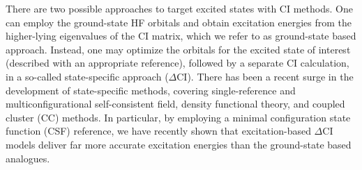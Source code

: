\documentclass[aip,jcp,reprint,noshowkeys,superscriptaddress]{revtex4-1}
\begin{document}
There are two possible approaches to target excited states with CI methods.
One can employ the ground-state HF orbitals and obtain excitation energies from the higher-lying eigenvalues of the CI matrix, which we refer to as ground-state based approach.
Instead, one may optimize the orbitals for the excited state of interest (described with an appropriate reference), followed by a separate CI calculation,
in a so-called state-specific approach ($\Delta$CI).
There has been a recent surge in the development of state-specific methods, covering 
single-reference and multiconfigurational self-consistent field,
\cite{Ziegler_1977,Burton_2021,Shea_2018,Tran_2019,Tran_2020,Hardikar_2020,Burton_2022,Hanscam_2022,Kossoski_2023,Marie_2023}
density functional theory, 
\cite{Filatov_1999,Kowalczyk_2011,Kowalczyk_2013,Gilbert_2008,Barca_2018,Hait_2020,Hait_2021,Hardikar_2020,Zhao_2020,Levi_2020,Carter-Fenk_2020,Toffoli_2022,Schmerwitz_2022}
and coupled cluster (CC)
\cite{Piecuch_2000,Mayhall_2010,Lee_2019,Kossoski_2021,Marie_2021,Rishi_2023}
methods.
In particular, by employing a minimal configuration state function (CSF) reference, 
we have recently shown that excitation-based $\Delta$CI models deliver far more accurate excitation energies than the ground-state based analogues. \cite{Kossoski_2023}
\end{document}
